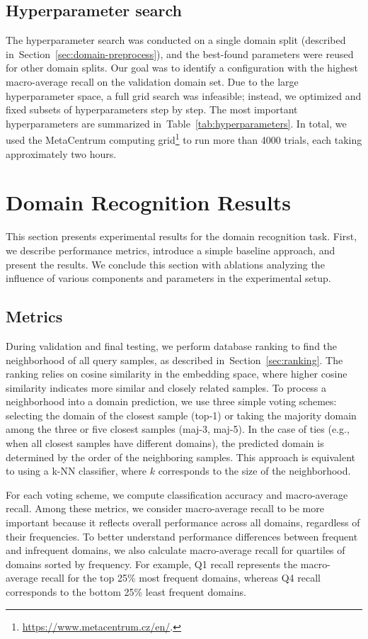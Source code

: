 \documentclass[lettersize,journal,twoside,article]{IEEEtran}
\newcommand{\secref}[1]{Section~\ref{#1}}
\newcommand{\tabref}[1]{Table~\ref{#1}}
\begin{document}
\subsection{Hyperparameter search}
The hyperparameter search was conducted on a single domain split (described in~\secref{sec:domain-preprocess}), and the best-found parameters were reused for other domain splits. Our goal was to identify a configuration with the highest macro-average recall on the validation domain set. Due to the large hyperparameter space, a full grid search was infeasible; instead, we optimized and fixed subsets of hyperparameters step by step. The most important hyperparameters are summarized in~\tabref{tab:hyperparameters}. In total, we used the MetaCentrum computing grid\footnote{\url{https://www.metacentrum.cz/en/}.} to run more than 4000 trials, each taking approximately two hours.

\section{Domain Recognition Results}
\label{sec:domain-recognition-results}
This section presents experimental results for the domain recognition task. First, we describe performance metrics, introduce a simple baseline approach, and present the results. We conclude this section with ablations analyzing the influence of various components and parameters in the experimental setup.

\subsection{Metrics}
\label{sec:metrics}
During validation and final testing, we perform database ranking to find the neighborhood of all query samples, as described in~\secref{sec:ranking}. The ranking relies on cosine similarity in the embedding space, where higher cosine similarity indicates more similar and closely related samples. To process a neighborhood into a domain prediction, we use three simple voting schemes: selecting the domain of the closest sample (top-1) or taking the majority domain among the three or five closest samples (maj-3, maj-5). In the case of ties (e.g., when all closest samples have different domains), the predicted domain is determined by the order of the neighboring samples. This approach is equivalent to using a k-NN classifier, where $k$ corresponds to the size of the neighborhood.

For each voting scheme, we compute classification accuracy and macro-average recall. Among these metrics, we consider macro-average recall to be more important because it reflects overall performance across all domains, regardless of their frequencies. To better understand performance differences between frequent and infrequent domains, we also calculate macro-average recall for quartiles of domains sorted by frequency. For example, Q1 recall represents the macro-average recall for the top 25\% most frequent domains, whereas Q4 recall corresponds to the bottom 25\% least frequent domains.
\end{document}
